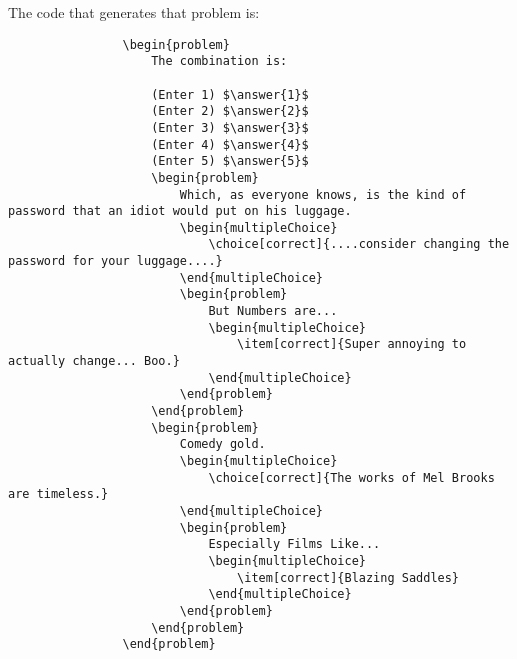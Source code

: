 \documentclass{ximera}
\begin{document}
            The code that generates that problem is:
            
            
            \begin{verbatim}
                \begin{problem}
                    The combination is:
                
                    (Enter 1) $\answer{1}$
                    (Enter 2) $\answer{2}$
                    (Enter 3) $\answer{3}$
                    (Enter 4) $\answer{4}$
                    (Enter 5) $\answer{5}$
                    \begin{problem}
                        Which, as everyone knows, is the kind of password that an idiot would put on his luggage.
                        \begin{multipleChoice}
                            \choice[correct]{....consider changing the password for your luggage....}
                        \end{multipleChoice}
                        \begin{problem}
                            But Numbers are...
                            \begin{multipleChoice}
                                \item[correct]{Super annoying to actually change... Boo.}
                            \end{multipleChoice}
                        \end{problem}
                    \end{problem}
                    \begin{problem}
                        Comedy gold.
                        \begin{multipleChoice}
                            \choice[correct]{The works of Mel Brooks are timeless.}
                        \end{multipleChoice}
                        \begin{problem}
                            Especially Films Like...
                            \begin{multipleChoice}
                                \item[correct]{Blazing Saddles}
                            \end{multipleChoice}
                        \end{problem}
                    \end{problem}
                \end{problem}
            
            \end{verbatim}
            
\end{document}
